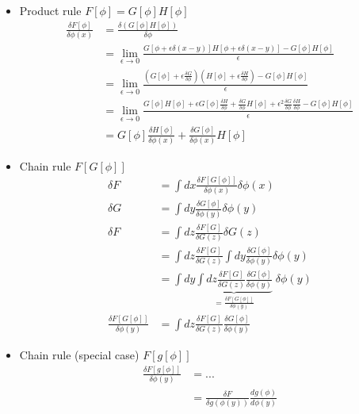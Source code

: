 \documentclass[10pt,a4paper]{article}
\theoremstyle{definition}
\begin{document}
\begin{itemize}
    \item Product rule $F[\phi]=G[\phi]H[\phi]$
    \begin{align}
        \frac{\delta F[\phi]}{\delta\phi(x)}
        &=\frac{\delta(G[\phi]H[\phi])}{\delta\phi}\\
        &=\lim_{\epsilon\rightarrow0}\frac{G[\phi+\epsilon\delta(x-y)]H[\phi+\epsilon\delta(x-y)]-G[\phi]H[\phi]}{\epsilon}\\
        &=\lim_{\epsilon\rightarrow0}\frac{\left(G[\phi]+\epsilon\frac{\delta G}{\delta\phi}\right)\left(H[\phi]+\epsilon\frac{\delta H}{\delta\phi}\right)-G[\phi]H[\phi]}{\epsilon}\\
        &=\lim_{\epsilon\rightarrow0}\frac{G[\phi]H[\phi]+\epsilon G[\phi]\frac{\delta H}{\delta\phi}+\frac{\delta G}{\delta\phi}H[\phi]+\epsilon^2\frac{\delta G}{\delta\phi}\frac{\delta H}{\delta\phi}-G[\phi]H[\phi]}{\epsilon}\\
        &=G[\phi]\frac{\delta H[\phi]}{\delta\phi(x)}+\frac{\delta G[\phi]}{\delta\phi(x)}H[\phi]
    \end{align}
    \item Chain rule $F[G[\phi]]$
    \begin{align}
        \delta F
        &=\int dx \frac{\delta F[G[\phi]]}{\delta\phi(x)} \delta\phi(x)\\
        \delta G
        &=\int dy \frac{\delta G[\phi]}{\delta\phi(y)} \delta\phi(y)\\
        \delta F
        &=\int dz \frac{\delta F[G]}{\delta G(z)} \delta G(z)\\
        &=\int dz \frac{\delta F[G]}{\delta G(z)} \int dy \frac{\delta G[\phi]}{\delta\phi(y)} \delta\phi(y) \\
        &=\int dy \underbrace{\int dz \frac{\delta F[G]}{\delta G(z)} \frac{\delta G[\phi]}{\delta\phi(y)}}_{=\frac{\delta F[G[\phi]]}{\delta\phi(y)}} \;\delta\phi(y) \\
        \frac{\delta F[G[\phi]]}{\delta\phi(y)}
        &=\int dz \frac{\delta F[G]}{\delta G(z)} \frac{\delta G[\phi]}{\delta\phi(y)}
    \end{align}
    \item Chain rule (special case) $F[g[\phi]]$
    \begin{align}
        \frac{\delta F[g[\phi]]}{\delta\phi(y)}
        &=...\\
        &=\frac{\delta F}{\delta g(\phi(y))} \frac{d g(\phi)}{d\phi(y)}
    \end{align}
\end{itemize}
\end{document}
